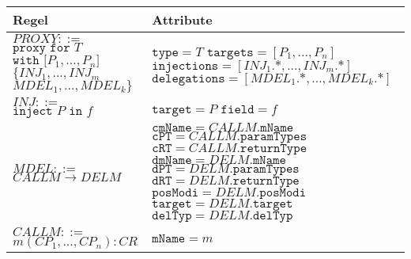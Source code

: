 \documentclass[a4paper,12pt]{article}
\begin{document}
\begin{table}[H]
\centering
\begin{tabular}{|p{6cm}|p{8cm}|}
\hline
\hline
\centering\textbf{Regel} & \textbf{Attribute} \\
\hline
\hline
$\mathit{PROXY} ::=$\newline
$\texttt{proxy } \texttt{for } T$\newline
$ \texttt{with [}\mathit{P_1},...,\mathit{P_n}\texttt{]}$ \newline
$\texttt{\{} \mathit{INJ_1},...,\mathit{INJ_m}$\newline
$\mathit{MDEL_1},...,\mathit{MDEL_k} \texttt{\}}$
& 
$\texttt{type} = \mathit{T}$\newline
$\texttt{targets} = [\mathit{P_1},...,\mathit{P_n}]$\newline
$\texttt{injections} = [\mathit{INJ_1}\texttt{.}\text{*},...,\mathit{INJ_m}\texttt{.}\text{*}]$\newline
$\texttt{delegations} = [\mathit{MDEL_1}\texttt{.}\text{*},...,\mathit{MDEL_k}\texttt{.}\text{*}]$
\\
\hline
$\mathit{INJ} ::=$\newline 
$\texttt{inject } P \texttt{ in } f$ 
& 
$\texttt{target} = \mathit{P}$\newline
$\texttt{field} = \mathit{f}$
\\
\hline
$\mathit{MDEL} ::=$\newline
$\mathit{CALLM} \rightarrow \mathit{DELM} $  
& 
$\texttt{cmName} = \mathit{CALLM}\texttt{.mName}$\newline
$\texttt{cPT} = \mathit{CALLM}\texttt{.paramTypes}$\newline
$\texttt{cRT} = \mathit{CALLM}\texttt{.returnType}$\newline
$\texttt{dmName} = \mathit{DELM}\texttt{.mName}$\newline
$\texttt{dPT} = \mathit{DELM}\texttt{.paramTypes}$\newline
$\texttt{dRT} = \mathit{DELM}\texttt{.returnType}$\newline
$\texttt{posModi} = \mathit{DELM}\texttt{.posModi}$\newline
$\texttt{target} = \mathit{DELM}\texttt{.target}$\newline
$\texttt{delTyp} = \mathit{DELM}\texttt{.delTyp}$
\\
\hline
$\mathit{CALLM} ::=$\newline $m(\mathit{CP_1},...,\mathit{CP_n}):CR $ 
& 
$\texttt{mName} = \mathit{m}$\newline

\end{tabular}
\end{table}
\end{document}

